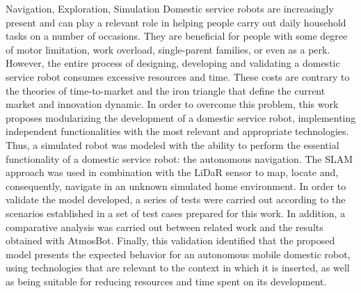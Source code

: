 \begin{englishabstract}{Navigation, Exploration, Simulation}
Domestic service robots are increasingly present and can play a relevant role in helping people carry out daily household tasks on a number of occasions. They are beneficial for people with some degree of motor limitation, work overload, single-parent families, or even as a perk. However, the entire process of designing, developing and validating a domestic service robot consumes excessive resources and time. These costs are contrary to the theories of time-to-market and the iron triangle that define the current market and innovation dynamic. In order to overcome this problem, this work proposes modularizing the development of a domestic service robot, implementing independent functionalities with the most relevant and appropriate technologies. Thus, a simulated robot was modeled with the ability to perform the essential functionality of a domestic service robot: the autonomous navigation. The SLAM approach was used in combination with the LiDaR sensor to map, locate and, consequently, navigate in an unknown simulated home environment. In order to validate the model developed, a series of tests were carried out according to the scenarios established in a set of test cases prepared for this work. In addition, a comparative analysis was carried out between related work and the results obtained with AtmosBot. Finally, this validation identified that the proposed model presents the expected behavior for an autonomous mobile domestic robot, using technologies that are relevant to the context in which it is inserted, as well as being suitable for reducing resources and time spent on its development.
\end{englishabstract}

